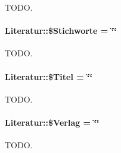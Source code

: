 TODO. 

\hypertarget{classLiteratur_aa77f0f697d4bcf72279aadedd91ddff}{
\paragraph[\$Stichworte]{\setlength{\rightskip}{0pt plus 5cm}Literatur::\$Stichworte = \char`\"{}\char`\"{}}\hfill}
\label{classLiteratur_aa77f0f697d4bcf72279aadedd91ddff}


TODO. 

\hypertarget{classLiteratur_e30f9e9db9b396e6f87adfdb94e12ba0}{
\paragraph[\$Titel]{\setlength{\rightskip}{0pt plus 5cm}Literatur::\$Titel = \char`\"{}\char`\"{}}\hfill}
\label{classLiteratur_e30f9e9db9b396e6f87adfdb94e12ba0}


TODO. 

\hypertarget{classLiteratur_5f591208e5d21bb81e6c51484e2a60e0}{
\paragraph[\$Verlag]{\setlength{\rightskip}{0pt plus 5cm}Literatur::\$Verlag = \char`\"{}\char`\"{}}\hfill}
\label{classLiteratur_5f591208e5d21bb81e6c51484e2a60e0}


TODO. 


